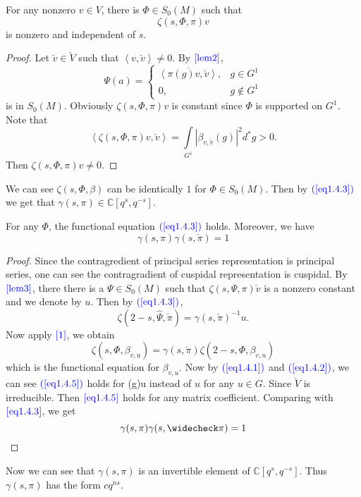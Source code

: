 \begin{proposition}\label{lem3}
For any nonzero $v\in V$, there is $\Phi\in S_0(M)$ such that 
\[
\zeta(s,\Phi, \pi) v
\]
is nonzero and independent of $s$.
\end{proposition}

\begin{proof}
Let $\check v\in \check V$ such that $\left \langle v,\check v\right \rangle \ne 0$. 
By $\textcolor{blue}{\ref{lem2}}$, 
\[
\Psi(a)=\begin{cases}
\overline {\left \langle \pi(g) v,\check v\right \rangle}, &g\in G^1 \\
0, &g\notin G^1
\end{cases}
\]
is in $S_0(M)$. Obviously $\zeta(s,\Phi,\pi)v$ is constant since $\Phi$ is supported on $G^1$. 
Note that 
\begin{equation*}
	\left \langle \zeta(s,\Phi,\pi)v,\check v\right \rangle =\int\limits_{G^1} \left | \beta_{v,\check v} (g)\right |^2 d^*g>0.
\end{equation*}
Then $\zeta(s,\Phi,\pi)v\ne 0$.
\end{proof}

We can see $\zeta (s,\Phi, \beta)$ can be identically $1$ for $\Phi \in S_0(M)$. Then by $\textcolor{blue}{(\ref{eq1.4.3})}$ we get that $\gamma(s,\pi) \in \mathbb C[q^s,q^{-s}]$.

\begin{theorem}
For any $\Phi$, the functional equation $\textcolor{blue}{(\ref{eq1.4.3})}$ holds. Moreover, we have 
\[
\gamma(s,\pi)\gamma(s,\check \pi)=1
\]
\end{theorem}

\begin{proof}
Since the contragredient of principal series representation is principal series, one can see the contragradient of cuspidal representation is cuspidal. By $\textcolor{blue}{\ref{lem3}}$, there there is a $\Psi \in S_0(M)$ such that 
$\zeta(s,\Psi,\pi) \check v$ is a nonzero constant and we denote by $u$. Then by $\textcolor{blue}{(\ref{eq1.4.3})}$, 
\[
\zeta(2-s,\widehat \Psi,\check \pi)=\gamma(s,\check \pi)^{-1}u.
\]
Now apply $\textcolor{blue}{\ref{1}}$, we obtain 
\begin{equation}\label{eq1.4.5}
\zeta(s,\Phi,\beta_{v,u}) =\gamma(s,\check \pi) \zeta(2-s,\Phi,\beta_{v,u})
\end{equation}
which is the functional equation for $\beta_{v,u}$.
Now by $\textcolor{blue}{(\ref{eq1.4.1})}$ and $\textcolor{blue}{(\ref{eq1.4.2})}$,
we can see  $\textcolor{blue}{(\ref{eq1.4.5})}$ holds for \pi(g)u instead of $u$ for any $u\in G$. Since $\check V$ is irreducible. Then $\textcolor{blue}{\ref{eq1.4.5}}$ holds for any matrix coefficient. Comparing with $\textcolor{blue}{\ref{eq1.4.3}}$, we get 
\[
\gamma(s,\pi)\gamma(s,\check \pi)=1 \qedhere
\]
\end{proof}

Now we can see that $\gamma(s,\pi)$ is an invertible element of $\mathbb C[q^s,q^{-s}]$. Thus $\gamma(s,\pi)$ has the form $cq^{ns}$.
